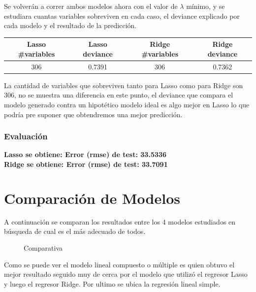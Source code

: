 Se volverán a correr ambos modelos ahora con el valor de $\lambda$ mínimo, y se estudiara cuantas variables sobreviven en cada caso, el deviance \cite{modelos} explicado por cada modelo y el resultado de la predicción.


\begin{center}
 \begin{tabular}{||c c c c||} 
 \hline
    Lasso \#variables & Lasso deviance & Ridge \#variables & Ridge deviance  \\ 
 \hline
    306 & 0.7391 & 306 & 0.7362\\
 \hline
 \hline
\end{tabular}
\end{center}



La cantidad de variables que sobreviven tanto para Lasso como para Ridge son 306, no se muestra una diferencia en este punto, el deviance que compara el modelo generado contra un hipotético modelo ideal es algo mejor en Lasso lo que podría pre suponer que obtendremos una mejor predicción.\\


\subsubsection{Evaluación}

\textbf{Lasso se obtiene: Error (rmse) de test: 33.5336}\\
\textbf{Ridge se obtiene: Error (rmse) de test: 33.7091} \\






\newpage
\section{Comparación de Modelos}

A continuación se comparan los resultados entre los 4 modelos estudiados en búsqueda de cual es el más adecuado de todos.

\begin{figure}[h]
\centering
{}%
\caption{Comparativa}
\label{comparativa}
\end{figure}


Como se puede ver el modelo lineal compuesto o múltiple es quien obtuvo el mejor resultado seguido muy de cerca por el modelo que utilizó el regresor Lasso y luego el regresor Ridge. Por ultimo se ubica la regresión lineal simple. 





